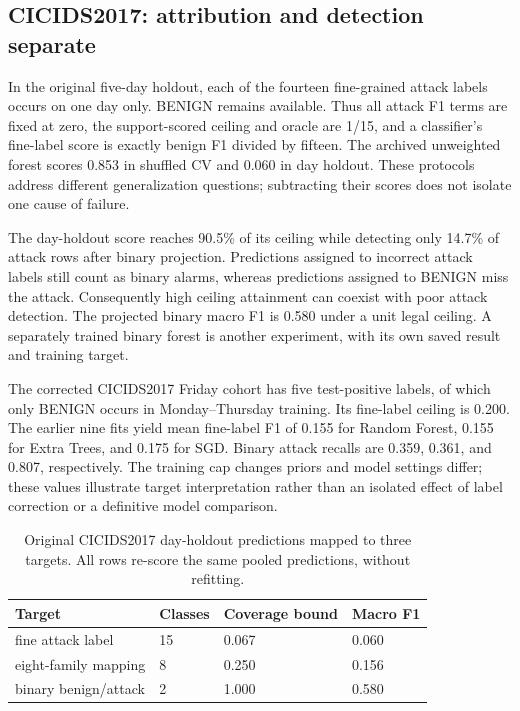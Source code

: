 \documentclass[twocolumn]{svjour3}
\begin{document}
\subsection{CICIDS2017: attribution and detection separate}
In the original five-day holdout, each of the fourteen fine-grained attack labels occurs on one day only. BENIGN remains available. Thus all attack F1 terms are fixed at zero, the support-scored ceiling and oracle are 1/15, and a classifier's fine-label score is exactly benign F1 divided by fifteen. The archived unweighted forest scores 0.853 in shuffled CV and 0.060 in day holdout. These protocols address different generalization questions; subtracting their scores does not isolate one cause of failure.

The day-holdout score reaches 90.5\% of its ceiling while detecting only 14.7\% of attack rows after binary projection. Predictions assigned to incorrect attack labels still count as binary alarms, whereas predictions assigned to BENIGN miss the attack. Consequently high ceiling attainment can coexist with poor attack detection. The projected binary macro F1 is 0.580 under a unit legal ceiling. A separately trained binary forest is another experiment, with its own saved result and training target.

The corrected CICIDS2017 Friday cohort has five test-positive labels, of which only BENIGN occurs in Monday--Thursday training. Its fine-label ceiling is 0.200. The earlier nine fits yield mean fine-label F1 of 0.155 for Random Forest, 0.155 for Extra Trees, and 0.175 for SGD. Binary attack recalls are 0.359, 0.361, and 0.807, respectively. The training cap changes priors and model settings differ; these values illustrate target interpretation rather than an isolated effect of label correction or a definitive model comparison.

\begin{table}[t]
\caption{Original CICIDS2017 day-holdout predictions mapped to three targets. All rows re-score the same pooled predictions, without refitting.}\label{tab-target}
\centering\small
\begin{tabular}{llll}\toprule
Target & Classes & Coverage bound & Macro F1\\
\midrule
fine attack label & 15 & 0.067 & 0.060\\
eight-family mapping & 8 & 0.250 & 0.156\\
binary benign/attack & 2 & 1.000 & 0.580\\
\bottomrule\end{tabular}
\end{table}
\end{document}
